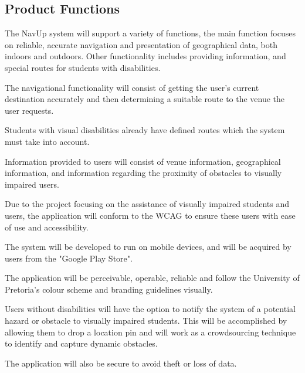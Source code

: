 	\subsection{Product Functions}
		The NavUp system will support a variety of functions, the main function focuses on reliable, accurate navigation and presentation of geographical data, both indoors and outdoors. Other functionality includes providing information, and special routes for students with disabilities.
		\\ \par\noindent
		The navigational functionality will consist of getting the user's current destination accurately and then determining a suitable route to the venue the user requests.\\ \par\noindent
		Students with visual disabilities already have defined routes which the system must take into account.\\ \par\noindent
		Information provided to users will consist of venue information, geographical information, and information regarding the proximity of obstacles to visually impaired users.\\ \par\noindent
		Due to the project focusing on the assistance of visually  impaired students and users, the application will conform to the WCAG to ensure these users with ease of use and accessibility.\\ \par\noindent
		The system will be developed to run on mobile devices, and will be acquired by users from the "Google Play Store".\\ \par\noindent
		The application will be perceivable, operable, reliable and follow the University of Pretoria's colour scheme and branding guidelines visually.\\ \par\noindent
		Users without disabilities will have the option to notify the system of a potential hazard or obstacle to visually impaired students. This will be accomplished by allowing them to drop a location pin and will work as a crowdsourcing technique to identify and capture dynamic obstacles. \\ \par\noindent
		The application will also be secure to avoid theft or loss of data.
			
	\newpage
